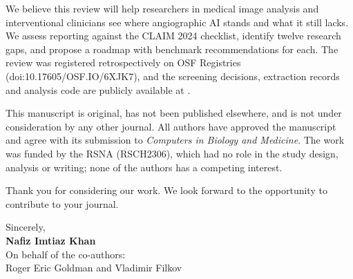 {\medskip
We believe this review will help researchers in medical image analysis and interventional clinicians see where angiographic AI stands and what it still lacks. We assess reporting against the CLAIM 2024 checklist, identify twelve research gaps, and propose a roadmap with benchmark recommendations for each. The review was registered retrospectively on OSF Registries (doi:10.17605/OSF.IO/6XJK7), and the screening decisions, extraction records and analysis code are publicly available at .

\medskip
This manuscript is original, has not been published elsewhere, and is not under consideration by any other journal. All authors have approved the manuscript and agree with its submission to \textit{Computers in Biology and Medicine}. The work was funded by the RSNA (RSCH2306), which had no role in the study design, analysis or writing; none of the authors has a competing interest.

\medskip
Thank you for considering our work. We look forward to the opportunity to contribute to your journal.

\bigskip
\noindent Sincerely,\\
\textbf{Nafiz Imtiaz Khan}\\
On behalf of the co-authors:\\
Roger Eric Goldman and Vladimir Filkov
}
\par\endgroup
